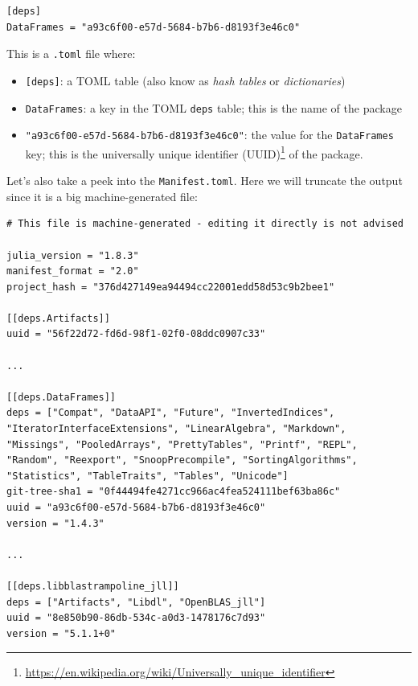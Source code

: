 \documentclass[
  notoc %
]{tufte-book}
\DeclareRobustCommand{\href}[2]{#2\footnote{\url{#1}}}
\providecommand{\tightlist}{%
  \setlength{\itemsep}{0pt}\setlength{\parskip}{0pt}
}
\newcommand{\passthrough}[1]{#1}
\begin{document}
\begin{lstlisting}
[deps]
DataFrames = "a93c6f00-e57d-5684-b7b6-d8193f3e46c0"
\end{lstlisting}

This is a \passthrough{\lstinline!.toml!} file where:

\begin{itemize}
\tightlist
\item
  \passthrough{\lstinline![deps]!}: a TOML table (also know as
  \emph{hash tables} or \emph{dictionaries})
\item
  \passthrough{\lstinline!DataFrames!}: a key in the TOML
  \passthrough{\lstinline!deps!} table; this is the name of the package
\item
  \passthrough{\lstinline!"a93c6f00-e57d-5684-b7b6-d8193f3e46c0"!}: the
  value for the \passthrough{\lstinline!DataFrames!} key; this is the
  \href{https://en.wikipedia.org/wiki/Universally_unique_identifier}{universally
  unique identifier (UUID)} of the package.
\end{itemize}

Let's also take a peek into the \passthrough{\lstinline!Manifest.toml!}.
Here we will truncate the output since it is a big machine-generated
file:

\begin{lstlisting}
# This file is machine-generated - editing it directly is not advised

julia_version = "1.8.3"
manifest_format = "2.0"
project_hash = "376d427149ea94494cc22001edd58d53c9b2bee1"

[[deps.Artifacts]]
uuid = "56f22d72-fd6d-98f1-02f0-08ddc0907c33"

...

[[deps.DataFrames]]
deps = ["Compat", "DataAPI", "Future", "InvertedIndices", "IteratorInterfaceExtensions", "LinearAlgebra", "Markdown", "Missings", "PooledArrays", "PrettyTables", "Printf", "REPL", "Random", "Reexport", "SnoopPrecompile", "SortingAlgorithms", "Statistics", "TableTraits", "Tables", "Unicode"]
git-tree-sha1 = "0f44494fe4271cc966ac4fea524111bef63ba86c"
uuid = "a93c6f00-e57d-5684-b7b6-d8193f3e46c0"
version = "1.4.3"

...

[[deps.libblastrampoline_jll]]
deps = ["Artifacts", "Libdl", "OpenBLAS_jll"]
uuid = "8e850b90-86db-534c-a0d3-1478176c7d93"
version = "5.1.1+0"
\end{lstlisting}
\end{document}
